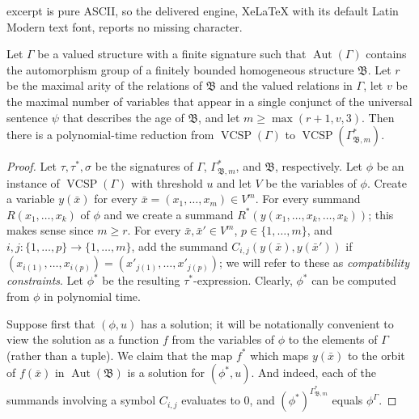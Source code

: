 \documentclass[10pt,a4paper]{amsart}
\DeclareMathOperator{\Aut}{Aut}
\DeclareMathOperator{\VCSP}{VCSP}
\newcommand{\bB}{{\mathfrak B}}
\begin{document}
excerpt is pure ASCII, so the delivered engine, XeLaTeX with its default Latin Modern text font, reports no missing character.
\begin{theorem}\label{thm:red-fin}
Let $\Gamma$ be a valued structure with a finite signature such that $\Aut(\Gamma)$ contains the automorphism group of a finitely bounded
homogeneous structure $\bB$.
Let $r$ be the maximal arity of the relations of $\bB$ and the valued relations in $\Gamma$,
let $v$ be the maximal number of variables that appear in a single conjunct
of the universal sentence $\psi$ that describes the age 
of $\bB$,
and let $m \geq \max(r+1,v,3)$. 
Then there is a polynomial-time reduction from $\VCSP(\Gamma)$ to $\VCSP(\Gamma^*_{\bB,m})$.
\end{theorem}

\begin{proof}
Let $\tau,\tau^*,\sigma$ be the signatures of $\Gamma$, $\Gamma^*_{\bB,m}$, and $\bB$, respectively.  Let $\phi$ be an instance of 
$\VCSP(\Gamma)$ with threshold $u$ and let $V$ be the variables of $\phi$.  
Create a variable $y({\bar x})$ for every 
$\bar x =(x_1, \dots, x_m) \in V^m$. For every summand $R(x_1,\dots,x_k)$ of $\phi$ and
we create a summand $R^*(y(x_1, \dots, x_k, \dots, x_k))$; this makes sense since $m\geq r$. 
For every $\bar{x}, \bar{x}' \in V^m$, $p \in \{1,\dots,m\}$, and 
$i,j \colon \{1,\dots,p\} \to \{1,\dots,m\}$, add the summand 
$C_{i,j}(y(\bar x),y(\bar x'))$
if $(x_{i(1)},\dots, x_{i(p)}) = (x'_{j(1)},\dots, x'_{j(p)})$; we will refer to these as \emph{compatibility constraints}.  
Let $\phi^*$ be the resulting $\tau^*$-expression. 
Clearly, $\phi^*$ can be computed from $\phi$ in polynomial time. 


Suppose first that $(\phi,u)$ has a solution;
it will be notationally convenient to view the solution as a function $f$ from the variables of $\phi$ to the elements of $\Gamma$ (rather than a tuple). We claim that the map $f^*$ which maps $y(\bar x)$ to the orbit of $f(\bar x)$ in $\Aut(\bB)$ is a solution for $(\phi^*,u)$. And indeed, 
each of the summands involving a symbol $C_{i,j}$ evaluates to $0$,
and 
$(\phi^*)^{\Gamma^*_{\bB,m}}$ equals 
$\phi^{\Gamma}$. 



\end{proof}
\end{document}
